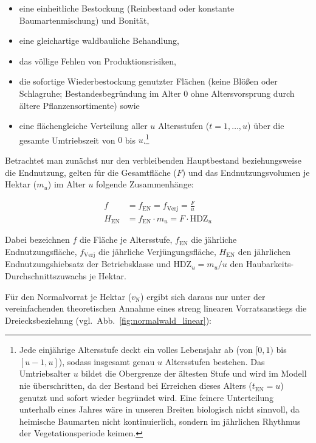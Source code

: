 \documentclass[twocolumn, paper=a4, fontsize=10pt]{scrartcl}
\begin{document}
\begin{itemize}
\item eine einheitliche Bestockung (Reinbestand oder konstante Baumartenmischung) und Bonität,
\item eine gleichartige waldbauliche Behandlung,
\item das völlige Fehlen von Produktionsrisiken,
\item die sofortige Wiederbestockung genutzter Flächen (keine Blößen oder Schlagruhe; Bestandesbegründung im Alter $0$ ohne Altersvorsprung durch ältere Pflanzensortimente) sowie
\item eine flächengleiche Verteilung aller $u$ Altersstufen ($t = 1, \dots, u$) über die gesamte Umtriebszeit von $0$ bis $u$.\footnote{Jede einjährige Altersstufe deckt ein volles Lebensjahr ab (von $[0,1)$ bis $[u-1,u]$), sodass insgesamt genau $u$ Altersstufen bestehen. Das Umtriebsalter $u$ bildet die Obergrenze der ältesten Stufe und wird im Modell nie überschritten, da der Bestand bei Erreichen dieses Alters ($t_{\text{EN}} = u$) genutzt und sofort wieder begründet wird. Eine feinere Unterteilung unterhalb eines Jahres wäre in unseren Breiten biologisch nicht sinnvoll, da heimische Baumarten nicht kontinuierlich, sondern im jährlichen Rhythmus der Vegetationsperiode keimen.}
\end{itemize}

Betrachtet man zunächst nur den verbleibenden Hauptbestand beziehungsweise die Endnutzung, gelten für die Gesamtfläche ($F$) und das Endnutzungsvolumen je Hektar ($m_u$) im Alter $u$ folgende Zusammenhänge:

\begin{equation}
  \begin{aligned}
    f &= f_{\text{EN}} = f_{\text{Verj}} = \frac{F}{u} \\
    H_{\text{EN}} &= f_{\text{EN}} \cdot m_u = F \cdot \text{HDZ}_u
  \end{aligned}
\end{equation}

Dabei bezeichnen $f$ die Fläche je Altersstufe, $f_{\text{EN}}$ die jährliche Endnutzungsfläche, $f_{\text{Verj}}$ die jährliche Verjüngungsfläche, $H_{\text{EN}}$ den jährlichen Endnutzungshiebsatz der Betriebsklasse und $\text{HDZ}_u = m_u / u$ den Haubarkeits-Durchschnittszuwachs je Hektar.

Für den Normalvorrat je Hektar ($v_{\text{N}}$) ergibt sich daraus nur unter der vereinfachenden theoretischen Annahme eines streng linearen Vorratsanstiegs die Dreiecksbeziehung (vgl.\ Abb.~\ref{fig:normalwald_linear}):
\end{document}
